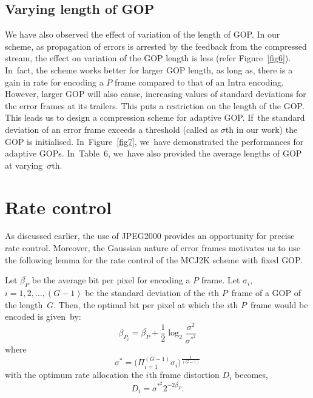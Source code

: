 \documentclass{doublecol-new}
\theoremstyle{TH}{
\newtheorem{lemma}{Lemma}[section]
\newtheorem{theorem}{Theorem}
\newtheorem{corrolary}{Corrolary}
\newtheorem{conjecture}[lemma]{Conjecture}
\newtheorem{proposition}[lemma]{Proposition}
\newtheorem{claim}[lemma]{Claim}
\newtheorem{stheorem}[lemma]{Wrong Theorem}
}
\theoremstyle{THrm}{
\newtheorem{definition}{Definition}[section]
\newtheorem{question}{Question}[section]
\newtheorem{remark}{Remark}[section]
\newtheorem{scheme}{Scheme}
}
\theoremstyle{THhit}{
\newtheorem{case}{Case}[section]
}
\begin{document}
\subsection{Varying length of GOP}

We have also observed the effect of variation of the length of GOP. In our
scheme, as propagation of errors is arrested by the feedback from the compressed
stream, the effect on variation of the GOP length is less (refer
Figure~\ref{fig6}). In~fact, the scheme works better for larger GOP length, as
long as, there is a gain in rate for encoding a $P$ frame compared to that of an
Intra encoding. However, larger GOP will also cause, increasing values of
standard deviations for the error frames at its trailers. This puts a
restriction on the length of the GOP. This leads us to design a compression
scheme for adaptive GOP. If~the standard deviation of an error frame exceeds a
threshold (called as $\sigma$th in our work) the GOP is initialised.
In~Figure~\ref{fig7}, we~have demonstrated the performances for adaptive GOPs.
In~Table~6, we~have also provided the average lengths of GOP at
varying~$\sigma$th.

\section{Rate control} \label{rate_control}

As discussed earlier, the use of JPEG2000 provides an opportunity for precise
rate control. Moreover, the Gaussian nature of error frames motivates us to use
the following lemma for the rate control of the MCJ2K scheme with fixed GOP.

\begin{lemma}\label{lemma_rt_gauss}
Let $\overline{\beta_P}$ be the average bit per pixel for encoding a $P$ frame.
Let $\sigma_i$, $i=1,2,\dots,(G-1)$ be the standard deviation of the $i$th
$P$~frame of a GOP of the length~$G$. Then, the optimal bit per pixel at which
the $i$th $P$~frame would be encoded is given~by:
\begin{equation}\label{eqn_bpp_optimal}
\beta_{P_i}=\overline{\beta_P}+ \frac{1}{2} \log_2 \frac{\sigma^2}{\sigma^{*^2}}
\end{equation}
where
\begin{equation}\label{eqn_sigma_gm}
\sigma^*= \big(\Pi_{i=1}^{(G-1)} \sigma_i\big)^{\frac{1}{(G-1)}}
\end{equation}
with the optimum rate allocation the $i$th frame distortion $D_i$ becomes,
\begin{equation}
D_i=\sigma^{*^2} 2^{-2\overline{\beta_P}}.
\end{equation}
\end{lemma}
\end{document}

